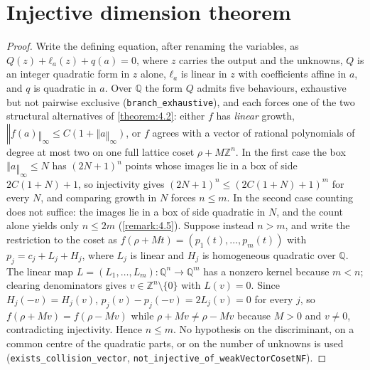 \section{Injective dimension theorem}\label{sec:4}
\begin{proof}
Write the defining equation, after renaming the variables, as $Q(z) + ℓ_{a}(z) + q(a) = 0$, where $z$ carries the output and the unknowns, $Q$ is an integer quadratic form in $z$ alone, $ℓ_{a}$ is linear in $z$ with coefficients affine in $a$, and $q$ is quadratic in $a$. Over $ℚ$ the form $Q$ admits five behaviours, exhaustive but not pairwise exclusive (\texttt{branch\_exhaustive}), and each forces one of the two structural alternatives of \cref{theorem:4.2}: either $f$ has \emph{linear} growth, $‖f(a)‖_{∞} ≤ C(1 + ‖a‖_{∞})$, or $f$ agrees with a vector of rational polynomials of degree at most two on one full lattice coset $ρ + Mℤ^{n}$. In the first case the box $‖a‖_{∞} ≤ N$ has $(2N+1)^{n}$ points whose images lie in a box of side $2C(1+N)+1$, so injectivity gives $(2N+1)^{n} ≤ (2C(1+N)+1)^{m}$ for every $N$, and comparing growth in $N$ forces $n ≤ m$. In the second case counting does not suffice: the images lie in a box of side quadratic in $N$, and the count alone yields only $n ≤ 2m$ (\cref{remark:4.5}). Suppose instead $n > m$, and write the restriction to the coset as $f(ρ + Mt) = (p_{1}(t), …, p_{m}(t))$ with $p_{j} = c_{j} + L_{j} + H_{j}$, where $L_{j}$ is linear and $H_{j}$ is homogeneous quadratic over $ℚ$. The linear map $L = (L_{1}, …, L_{m}) : ℚ^{n} → ℚ^{m}$ has a nonzero kernel because $m < n$; clearing denominators gives $v ∈ ℤ^{n} \setminus \{0\}$ with $L(v) = 0$. Since $H_{j}(-v) = H_{j}(v)$, $p_{j}(v) - p_{j}(-v) = 2L_{j}(v) = 0$ for every $j$, so $f(ρ + Mv) = f(ρ - Mv)$ while $ρ + Mv ≠ ρ - Mv$ because $M > 0$ and $v ≠ 0$, contradicting injectivity. Hence $n ≤ m$. No hypothesis on the discriminant, on a common centre of the quadratic parts, or on the number of unknowns is used (\texttt{exists\_collision\_vector}, \texttt{not\_injective\_of\_weakVectorCosetNF}).

\end{proof}
